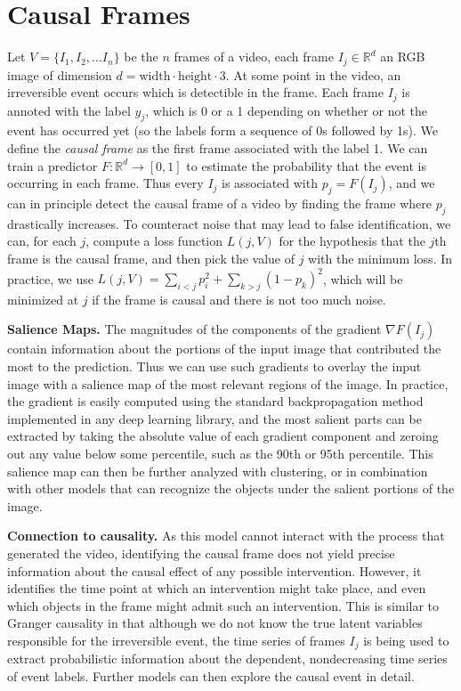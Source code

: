 \documentclass[letterpaper, twocolumn]{article} %
\begin{document}
\section{Causal Frames}

Let $V = \{I_1, I_2, ... I_n\}$ be the $n$ frames of a video, each frame $I_j  \in \mathbb{R}^d$ an RGB image of dimension $d=\text{width}\cdot\text{height}\cdot 3$. At some point in the video, an irreversible event occurs which is detectible in the frame. Each frame $I_j$ is annoted with the label $y_j$, which is 0 or a 1 depending on whether or not the event has occurred yet (so the labels form a sequence of 0s followed by 1s). We define the \emph{causal frame} as the first frame associated with the label 1. We can train a predictor $F: \mathbb{R}^d \rightarrow [0,1]$ to estimate the probability that the event is occurring in each frame. Thus every $I_j$ is associated with $p_j = F(I_j)$, and we can in principle detect the causal frame of a video by finding the frame where $p_j$ drastically increases. To counteract noise that may lead to false identification, we can, for each $j$, compute a loss function $L(j, V)$ for the hypothesis that the $j$th frame is the causal frame, and then pick the value of $j$ with the minimum loss. In practice, we use  $L(j, V) = \sum_{i<j} p_i^2 + \sum_{k>j} (1-p_k)^2$, which will be minimized at $j$ if the frame is causal and there is not too much noise. %

\noindent \textbf{Salience Maps.} The magnitudes of the components of the gradient $\nabla F(I_j)$ contain information about the portions of the input image that contributed the most to the prediction. Thus we can use such gradients to overlay the input image with a salience map of the most relevant regions of the image. In practice, the gradient is easily computed using the standard backpropagation method implemented in any deep learning library, and the most salient parts can be extracted by taking the absolute value of each gradient component and zeroing out any value below some percentile, such as the 90th or 95th percentile. This salience map can then be further analyzed with clustering, or in combination with other models that can recognize the objects under the salient portions of the image.

\noindent \textbf{Connection to causality.} As this model cannot interact with the process that generated the video, identifying the causal frame does not yield precise information about the causal effect of any possible intervention. However, it identifies the time point at which an intervention might take place, and even which objects in the frame might admit such an intervention. This is similar to Granger causality in that although we do not know the true latent variables responsible for the irreversible event,  the time series of frames $I_j$ is being used to extract probabilistic information about the dependent, nondecreasing time series of event labels. Further models can then explore the causal event in detail. 
\end{document}

